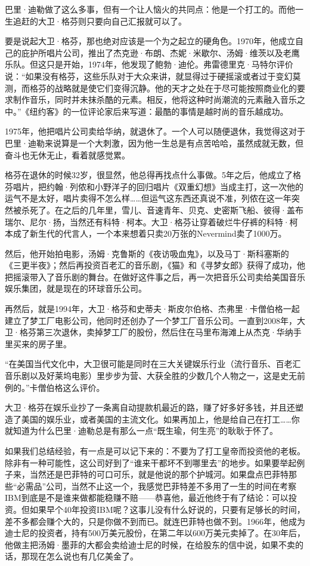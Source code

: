 巴里·迪勒做了这么多事，但有一个让人恼火的共同点：他是一个打工的。而他一生追赶的大卫·格芬则只要向自己汇报就可以了。

要是说起大卫·格芬，那也绝对应该是一个为之起立的硬角色。1970年，他成立自己的庇护所唱片公司，推出了杰克逊·布朗、杰妮·米歇尔、汤姆·维茨以及老鹰乐队。但这只是开始，1974年，他发现了鲍勃·迪伦。弗雷德里克·马特尔评价说：``如果没有格芬，这些乐队对于大众来讲，就显得过于硬摇滚或者过于变幻莫测，而格芬的战略就是使它们变得沉静。他的天才之处在于尽可能按照商业化的要求制作音乐，同时并未抹杀酷的元素。相反，他将这种时尚潮流的元素融入音乐之中。''《纽约客》的一位评论家后来写道：最酷的事情是越时尚的音乐越成功。

1975年，他把唱片公司卖给华纳，就退休了。一个人可以随便退休，我觉得这对于巴里·迪勒来说算是一个大刺激，因为他一生总是有点苦哈哈，虽然成就无数，但奋斗也无休无止，看着就感觉累。

格芬在退休的时候32岁，很显然，他总得再找点什么事做。5年之后，他成立了格芬唱片，把约翰·列侬和小野洋子的回归唱片《双重幻想》当成主打，这一次他的运气不是太好，唱片卖得不怎么样\ldots\ldots 但运气这东西还真说不准，列侬在这一年突然被杀死了。在之后的几年里，雪儿、音速青年、贝克、史密斯飞船、彼得·盖布瑞尔、尼尔·扬，当然还有科特·柯本。大卫·格芬让穿着破烂牛仔裤的科特·柯本成了新生代的代言人，一个本来想着只卖20万张的Nevermind卖了1000万。

然后，他开始拍电影，汤姆·克鲁斯的《夜访吸血鬼》，以及马丁·斯科塞斯的《三更半夜》；然后再投资百老汇的音乐剧，《猫》和《寻梦女郎》获得了成功，他把摇滚带入了音乐剧的舞台。在做好这件事之后，再一次把音乐公司卖给美国音乐娱乐集团，就是现在的环球音乐公司。

再然后，就是1994年，大卫·格芬和史蒂夫·斯皮尔伯格、杰弗里·卡僧伯格一起建立了梦工厂电影公司，他同时还创办了一个梦工厂音乐公司。一直到2008年，大卫·格芬第三次退休，卖掉梦工厂的股份，然后住在马里布海滩上从杰克·华纳手里买来的房子里。

``在美国当代文化中，大卫很可能是同时在三大关键娱乐行业（流行音乐、百老汇音乐剧以及好莱坞电影）里步步为营、大获全胜的少数几个人物之一，这是史无前例的。''卡僧伯格这么评价。

大卫·格芬在娱乐业抄了一条离自动提款机最近的路，赚了好多好多钱，并且还塑造了美国的娱乐业，或者美国的主流文化。如果再加上，他是给自己在打工\ldots\ldots 你就知道为什么巴里·迪勒总是有那么一点``既生瑜，何生亮''的耿耿于怀了。

如果我们总结经验，有一点是可以记下来的：不要为了打工皇帝而投资他的老板。除非有一种可能性，这公司好到了``谁来干都坏不到哪里去''的地步。如果要举起例子来，当然还是巴菲特的可口可乐，就是他说的那个护城河。如果盘点巴菲特那些``必需品''公司，当然不止这一个，我感觉巴菲特差不多用了一生的时间在考察IBM到底是不是谁来做都能稳赚不赔------恭喜他，最近他终于有了结论：可以投资。但如果早个40年投资IBM呢？这事儿没有什么好说的，只要有足够长的时间，差不多都会赚个大的，只是你做不到而已。就连巴菲特也做不到。1966年，他成为迪士尼的投资者，持有500万美元股份，在第二年以600万美元卖掉了。在30年后，他做主把汤姆·墨菲的大都会卖给迪士尼的时候，在给股东的信中说，如果不卖的话，那现在怎么说也有几亿美金了。

